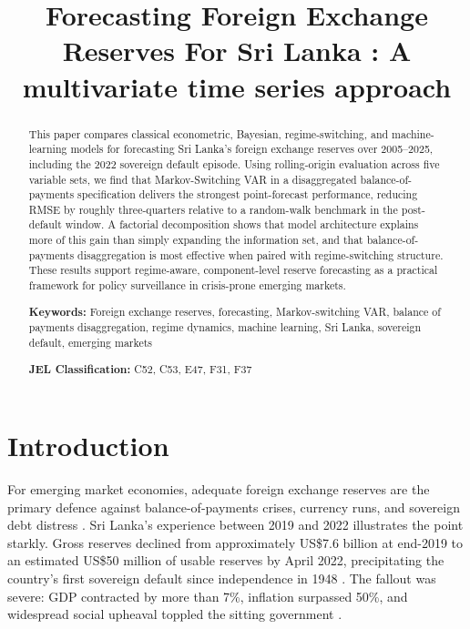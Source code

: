 \documentclass[12pt,a4paper]{article}
\title{Forecasting Foreign Exchange Reserves For Sri Lanka : A multivariate time series approach}
\author{}
\date{}
\begin{document}
\maketitle

\begin{abstract}
This paper compares classical econometric, Bayesian, regime-switching, and machine-learning models for forecasting Sri Lanka's foreign exchange reserves over 2005--2025, including the 2022 sovereign default episode. Using rolling-origin evaluation across five variable sets, we find that Markov-Switching VAR in a disaggregated balance-of-payments specification delivers the strongest point-forecast performance, reducing RMSE by roughly three-quarters relative to a random-walk benchmark in the post-default window. A factorial decomposition shows that model architecture explains more of this gain than simply expanding the information set, and that balance-of-payments disaggregation is most effective when paired with regime-switching structure. These results support regime-aware, component-level reserve forecasting as a practical framework for policy surveillance in crisis-prone emerging markets.

\noindent\textbf{Keywords:} Foreign exchange reserves, forecasting, Markov-switching VAR, balance of payments disaggregation, regime dynamics, machine learning, Sri Lanka, sovereign default, emerging markets

\noindent\textbf{JEL Classification:} C52, C53, E47, F31, F37
\end{abstract}

\section{Introduction}

For emerging market economies, adequate foreign exchange reserves are the primary defence against balance-of-payments crises, currency runs, and sovereign debt distress \citep{JeanneRanciere2011}. Sri Lanka's experience between 2019 and 2022 illustrates the point starkly. Gross reserves declined from approximately US\$7.6 billion at end-2019 to an estimated US\$50 million of usable reserves by April 2022, precipitating the country's first sovereign default since independence in 1948 \citep{Athukorala2024}. The fallout was severe: GDP contracted by more than 7\%, inflation surpassed 50\%, and widespread social upheaval toppled the sitting government \citep{Weerakoon2023}.
\end{document}
